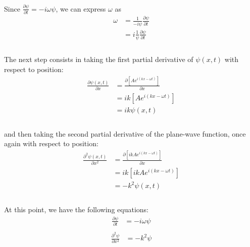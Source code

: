 \documentclass[letter]{article}
\begin{document}
\begin{enumerate}
    \paragraph{} Since $\frac{\partial \psi}{\partial t}=-i\omega\psi$, we can express $\omega$ as
    \begin{equation}
        \begin{split}
            \omega 
            &= \frac{1}{-i\psi}\frac{\partial \psi}{\partial t}\\
            &= i\frac{1}{\psi}\frac{\partial \psi}{\partial t}\\
        \end{split}
    \end{equation}
    \paragraph{}The next step consists in taking the first partial derivative of $\psi(x,t)$ with respect to position:
    \begin{equation}
        \begin{split}
            \frac{\partial \psi(x,t)}{\partial x} 
            &= \frac{\partial [Ae^{i(kx-\omega t)}]}{\partial x}\\
            &= ik[Ae^{i(kx-\omega t)}]\\
            &= ik \psi(x,t)\\
        \end{split}
    \end{equation}
    \paragraph{}and then taking the second partial derivative of the plane-wave function, once again with respect to position:
    \begin{equation}
        \begin{split}
            \frac{\partial^2 \psi(x,t)}{\partial x^2} 
            &= \frac{\partial [ikAe^{i(kx-\omega t)}]}{\partial x}\\
            &= ik[ikAe^{i(kx-\omega t)}]\\
            &= -k^2 \psi(x,t)\\
        \end{split}
    \end{equation}
    \paragraph{}At this point, we have the following equations:
    \begin{equation}
        \begin{split}
            \frac{\partial\psi}{\partial t}
            &= -i\omega\psi\\
            \end{split}
    \end{equation}
    \begin{equation}
        \begin{split}
            \frac{\partial^2 \psi}{\partial x^2}
            &= -k^2\psi\\
        \end{split}
    \end{equation}

\end{enumerate}
\end{document}
